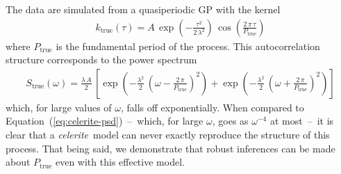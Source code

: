 \documentclass[manuscript, letterpaper]{aastex6}
\newcommand{\celeriteterm}{\emph{celerite}}
\renewcommand{\eqref}[1]{\ref{eq:#1}}
\newcommand{\Eq}[1]{Equation~(\eqref{#1})}
\newcommand{\eq}[1]{\Eq{#1}}
\newcommand{\eqlabel}[1]{\label{eq:#1}}
\begin{document}
The data are simulated from a quasiperiodic GP with the kernel
\begin{eqnarray}\eqlabel{sim-wrong-true}
    k_\mathrm{true} (\tau) = A\,
    \exp\left(-\frac{\tau^2}{2\,\lambda^2}\right)\,
    \cos\left(\frac{2\,\pi\,\tau}{P_\mathrm{true}}\right)
\end{eqnarray}
where $P_\mathrm{true}$ is the fundamental period of the process.
This autocorrelation structure corresponds to the power spectrum
\citep{Wilson:2013}
\begin{eqnarray}
    S_\mathrm{true} (\omega) = \frac{\lambda\,A}{2}\,\left[
        \exp\left(-\frac{\lambda^2}{2}\,\left(\omega-
        \frac{2\,\pi}{P_\mathrm{true}}\right)^2\right) +
        \exp\left(-\frac{\lambda^2}{2}\,\left(\omega+
        \frac{2\,\pi}{P_\mathrm{true}}\right)^2\right)
        \right]
\end{eqnarray}
which, for large values of $\omega$, falls off exponentially.
When compared to \eq{celerite-psd}~--~which, for large $\omega$, goes as
$\omega^{-4}$ at most~--~it is clear that a \celeriteterm\ model can never
exactly reproduce the structure of this process.
That being said, we demonstrate that robust inferences can be made about
$P_\mathrm{true}$ even with this effective model.
\end{document}
